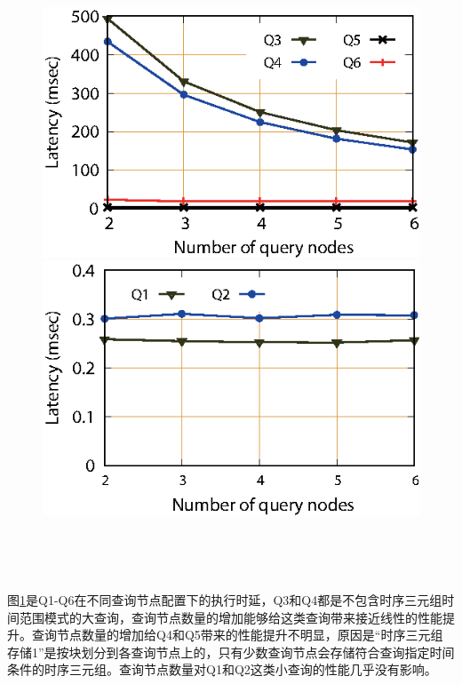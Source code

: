 \begin{figure}[!hpt]
\centering
\begin{minipage}{.45\linewidth}
\centering\includegraphics{figures/scale-server1.eps}
\end{minipage}
\begin{minipage}{.45\linewidth}
\centering\includegraphics{figures/scale-server2.eps}
\end{minipage} \\[10pt]
\begin{minipage}{1\linewidth}
\label{scale-server}
\end{minipage} \\[-10pt]
\end{figure}

图\ref{scale-server}是Q1-Q6在不同查询节点配置下的执行时延，Q3和Q4都是不包含时序三元组时间范围模式的大查询，查询节点数量的增加能够给这类查询带来接近线性的性能提升。查询节点数量的增加给Q4和Q5带来的性能提升不明显，原因是“时序三元组存储1”是按块划分到各查询节点上的，只有少数查询节点会存储符合查询指定时间条件的时序三元组。查询节点数量对Q1和Q2这类小查询的性能几乎没有影响。

